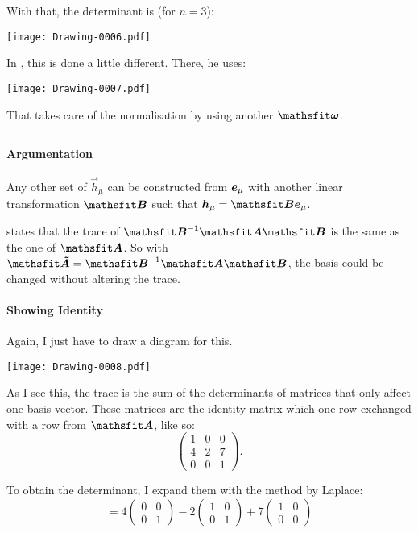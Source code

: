 With that, the determinant is (for $n = 3$):
\begin{center}
    \texttt{[image: Drawing-0006.pdf]}
\end{center}

In \parencite{penrose-road_to_reality}, this is done a little different. There,
he uses:
\begin{center}
    \texttt{[image: Drawing-0007.pdf]}
\end{center}

That takes care of the normalisation by using another $\tens \omega$.

\subsection{}

\paragraph{Argumentation}

Any other set of $\vec h_\mu$ can be constructed from $\boldsymbol{e}_\mu$ with another
linear transformation $\tens B$ such that $\vec h_\mu = \tens B \ev_\mu$.

\parencite{wikipedia/Trace} states that the trace of $\tens B^{-1} \tens A
\tens B$ is the same as the one of $\tens A$. So with $\tens{\tilde A} = \tens
B^{-1} \tens A \tens B$, the basis could be changed without altering the trace.

\paragraph{Showing Identity}

Again, I just have to draw a diagram for this.
\begin{center}
    \texttt{[image: Drawing-0008.pdf]}
\end{center}

As I see this, the trace is the sum of the determinants of matrices that only
affect one basis vector. These matrices are the identity matrix which one row
exchanged with a row from $\tens A$, like so:
\[
    \begin{pmatrix}
        1 & 0 & 0 \\
        4 & 2 & 7 \\
        0 & 0 & 1
    \end{pmatrix}.
\]

To obtain the determinant, I expand them with the method by Laplace:
\[
    = 4 \begin{pmatrix}
        0 & 0 \\ 0 & 1
    \end{pmatrix}
    - 2 \begin{pmatrix}
        1 & 0 \\ 0 & 1
    \end{pmatrix}
    + 7 \begin{pmatrix}
        1 & 0 \\ 0 & 0
    \end{pmatrix}
\]

